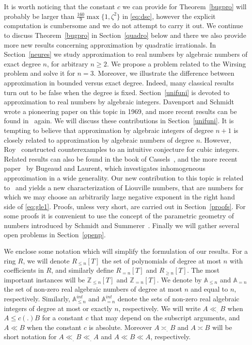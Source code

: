 \documentclass[12pt]{amsart}
\theoremstyle{definition}
\begin{document}
It is worth noticing that the constant $c$ we can provide
for Theorem~\ref{bugpro}
will probably be larger than $\frac{160}{9}\max\{ 1,\zeta^{2}\}$ in \eqref{eq:dsc}, however the explicit computation is cumbersome
and we do not attempt to carry it out.
We continue to discuss Theorem~\ref{bugpro} in
Section~\ref{quadro} below 
and there we also provide more new results concerning
approximation by quadratic irrationals.
In Section~\ref{neures} we study approximation to real numbers 
by algebraic numbers of exact degree $n$, for arbitrary $n\geq 2$. 
We propose a problem related to the Wirsing problem
and solve it for $n=3$.
Moreover,
we illustrate the difference between approximation in bounded 
versus exact degree. Indeed, many classical results turn out
to be false when the degree is fixed.
Section~\ref{unifuni} is devoted to approximation to real numbers
by algebraic integers. 
Davenport and Schmidt~\cite{davsh} wrote a pioneering paper on this topic
in 1969, and more recent results can be found 
in~\cite{bugbuch,teu,teuallein} again. We will discuss these
contributions in Section~\ref{unifuni}. It is tempting to believe that
approximation by algebraic integers of 
degree $n+1$ is closely
related to approximation by algebraic numbers of degree $n$. However,  
Roy~\cite{roy,roy2} constructed counterexamples to an intuitive conjecture for cubic integers.
Related results can also be found in the book of Cassels~\cite{cassels}, and the more recent paper~\cite{bula} by
Bugeaud and Laurent, which investigates inhomogeneous approximation in a wide generality. 
Our new contribution to this topic is related to~\cite{bula} and yields a new characterization of Liouville numbers, that are
numbers for which we may choose an arbitrarily large negative exponent 
in the right hand side of \eqref{eq:gle1}. Proofs, unless very short, 
are carried out in Section~\ref{proofs}. For some 
proofs it is convenient to use the
concept of the parametric geometry of numbers introduced 
by Schmidt and Summerer~\cite{ss}.
Finally we will gather several open problems in Section~\ref{openp}.

We enclose some notation which will simplify the formulation of our results. For a ring $R$, we will denote $R_{\leq n}[T]$ the set of polynomials of degree at most $n$ with coefficients 
in $R$, and similarly define $R_{=n}[T]$ and $R_{\geq n}[T]$. 
The most important instances will be
$\mathbb{Z}_{\leq n}[T]$ and $\mathbb{Z}_{=n}[T]$. 
We denote by $\mathbb{A}_{\leq n}$ and $\mathbb{A}_{=n}$ the set of 
non-zero real
algebraic numbers of degree at most $n$ and equal to $n$, respectively. Similarly,
$\mathbb{A}_{\leq n}^{int}$ and $\mathbb{A}_{=n}^{int}$ denote the sets of non-zero real algebraic integers of degree
at most or exactly $n$, respectively.
We will write $A\ll_{.} B$ when $A\leq c(.)B$ for a constant $c$ that may depend on the subscript arguments, 
and $A\ll B$ when the constant $c$ is absolute. 
Moreover $A\asymp_{.} B$ and $A\asymp B$ will be short notation for 
$A\ll_{.} B\ll_{.} A$ and $A\ll B\ll A$, respectively.
\end{document}
